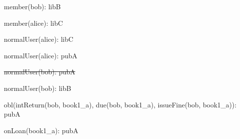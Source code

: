 \documentclass{article}
\begin{document}
{\begin{minipage}{\tableWidth}
\begin{description}[align=left,leftmargin=1em,noitemsep,labelsep=\parindent]
\item{{member(\allowbreak{}bob): libB}}
\item{{member(\allowbreak{}alice): libC}}
\item{{normalUser(\allowbreak{}alice): libC}}
\item{{normalUser(\allowbreak{}alice): pubA}}
\item{\sout{normalUser(\allowbreak{}bob): pubA}}
\item{{normalUser(\allowbreak{}bob): libB}}
\item{{obl(\allowbreak{}intReturn(\allowbreak{}bob, book1\_a), due(\allowbreak{}bob, book1\_a), issueFine(\allowbreak{}bob, book1\_a)): pubA}}
\item{{onLoan(\allowbreak{}book1\_a): pubA}}
\end{description}\end{minipage}}
\end{document}
